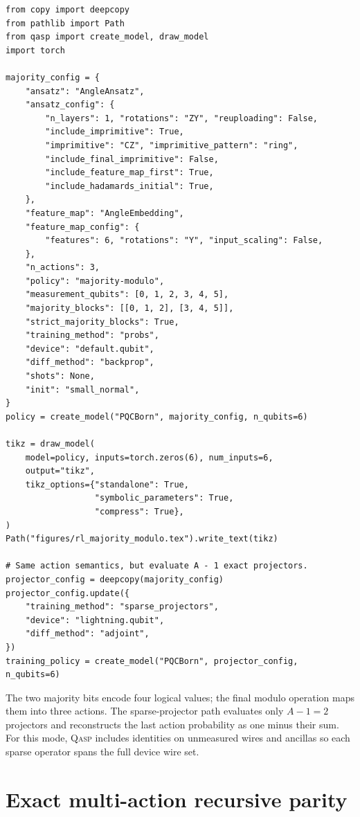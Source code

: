\documentclass[10pt]{article}
\newcommand{\qasp}{\textsc{Qasp}}
\begin{document}
\begin{lstlisting}[caption={Drawing the probability-mode majority--modulo circuit and constructing its exact sparse-projector training variant.},label={lst:majority}]
from copy import deepcopy
from pathlib import Path
from qasp import create_model, draw_model
import torch

majority_config = {
    "ansatz": "AngleAnsatz",
    "ansatz_config": {
        "n_layers": 1, "rotations": "ZY", "reuploading": False,
        "include_imprimitive": True,
        "imprimitive": "CZ", "imprimitive_pattern": "ring",
        "include_final_imprimitive": False,
        "include_feature_map_first": True,
        "include_hadamards_initial": True,
    },
    "feature_map": "AngleEmbedding",
    "feature_map_config": {
        "features": 6, "rotations": "Y", "input_scaling": False,
    },
    "n_actions": 3,
    "policy": "majority-modulo",
    "measurement_qubits": [0, 1, 2, 3, 4, 5],
    "majority_blocks": [[0, 1, 2], [3, 4, 5]],
    "strict_majority_blocks": True,
    "training_method": "probs",
    "device": "default.qubit",
    "diff_method": "backprop",
    "shots": None,
    "init": "small_normal",
}
policy = create_model("PQCBorn", majority_config, n_qubits=6)

tikz = draw_model(
    model=policy, inputs=torch.zeros(6), num_inputs=6,
    output="tikz",
    tikz_options={"standalone": True,
                  "symbolic_parameters": True,
                  "compress": True},
)
Path("figures/rl_majority_modulo.tex").write_text(tikz)

# Same action semantics, but evaluate A - 1 exact projectors.
projector_config = deepcopy(majority_config)
projector_config.update({
    "training_method": "sparse_projectors",
    "device": "lightning.qubit",
    "diff_method": "adjoint",
})
training_policy = create_model("PQCBorn", projector_config, n_qubits=6)
\end{lstlisting}

The two majority bits encode four logical values; the final modulo operation maps them into three actions.  The sparse-projector path evaluates only $A-1=2$ projectors and reconstructs the last action probability as one minus their sum.  For this mode, \qasp{} includes identities on unmeasured wires and ancillas so each sparse operator spans the full device wire set.

\section{Exact multi-action recursive parity}
\label{app:multiaction-parity}
\end{document}

